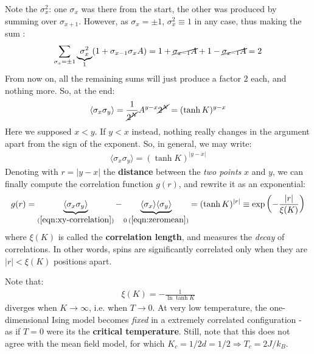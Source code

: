 \documentclass[../../main.tex]{subfiles}
\begin{document}
Note the $\sigma_x^2$: one $\sigma_x$ was there from the start, the other was produced by summing over $\sigma_{x+1}$. However, as $\sigma_x = \pm 1$, $\sigma_x^2 \equiv 1$ in any case, thus making the sum :
\begin{align*}
    \sum_{\sigma_x = \pm 1} \underbrace{\sigma_x^2}_{1} (1+\sigma_{x-1}\sigma_xA) = 1 + \cancel{\sigma_{x-1}A} + 1 - \cancel{\sigma_{x-1}A} = 2
\end{align*}
From now on, all the remaining sums will just produce a factor $2$ each, and nothing more. So, at the end:
\begin{align*}
    \langle \sigma_x \sigma_y \rangle = \frac{1}{\cancel{2^N}} A^{y-x} \cancel{2^N} = (\tanh K)^{y-x}
\end{align*}
Here we supposed $x < y$. If $y < x$ instead, nothing really changes in the argument apart from the sign of the exponent. So, in general, we may write:
\begin{align}\label{eqn:xy-correlation}
    \langle \sigma_x \sigma_y \rangle = (\tanh K)^{|y-x|}
\end{align}
Denoting with $r = |y-x|$ the \textbf{distance} between the \textit{two points} $x$ and $y$, we can finally compute the correlation function $g(r)$, and rewrite it as an exponential:
\begin{align}\label{eqn:2point-exp-behaviour}
    g(r) = \underbrace{\langle \sigma_x \sigma_y \rangle}_{(\ref{eqn:xy-correlation})}  - \underbrace{\langle \sigma_x \rangle \langle \sigma_y \rangle}_{0\>(\ref{eqn:zeromean})} = (\tanh K)^{|r|} \equiv \exp\left(-\frac{|r|}{\xi(K)} \right)
\end{align}
where $\xi(K)$ is called the \textbf{correlation length}, and measures the \textit{decay} of correlations. In other words, spins are significantly correlated only when they are $|r| < \xi(K)$ positions apart. 

\medskip

Note that:
\begin{align*}
    \xi(K) = - \frac{1}{\ln \tanh K}  
\end{align*}
diverges when $K \to \infty$, i.e. when $T \to 0$. At very low temperature, the one-dimensional Ising model becomes \textit{fixed} in a extremely correlated configuration - as if $T=0$ were its the \textbf{critical temperature}. Still, note that this does not agree with the mean field model, for which $K_c = 1/2d = 1/2 \Rightarrow T_c = 2 J /k_B$. 

\medskip
\end{document}
